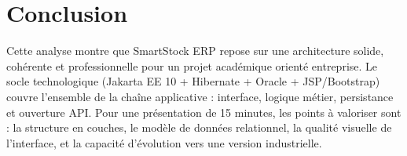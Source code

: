 \documentclass[12pt,a4paper]{report}
\begin{document}
\chapter*{Conclusion}
Cette analyse montre que SmartStock ERP repose sur une architecture solide, coh\'erente et professionnelle pour un projet acad\'emique orient\'e entreprise. Le socle technologique (Jakarta EE 10 + Hibernate + Oracle + JSP/Bootstrap) couvre l'ensemble de la cha\^ine applicative : interface, logique m\'etier, persistance et ouverture API. Pour une pr\'esentation de 15 minutes, les points \`a valoriser sont : la structure en couches, le mod\`ele de donn\'ees relationnel, la qualit\'e visuelle de l'interface, et la capacit\'e d'\'evolution vers une version industrielle.
\end{document}
